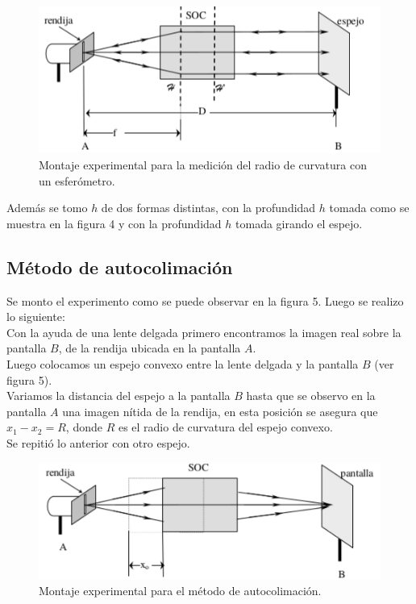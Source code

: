 \documentclass[13,twocolumn,letterpaper]{article}
\begin{document}
{{	\begin{figure}[h!]
		\centering
		\includegraphics[width=0.7\linewidth]{fig4}
		\caption[fig 4]{Montaje experimental para la medición del radio de curvatura con un esferómetro.}
		\label{fig:fig4}
	\end{figure}
Además se tomo $h$ de dos formas distintas, con la profundidad $h$ tomada como se muestra en la figura 4 y con la profundidad $h$ tomada girando el espejo. 

}
\subsection*{Método de autocolimación}
{
	Se monto el experimento como se puede observar en la figura 5. Luego se realizo lo siguiente:\\ 
	Con la ayuda de una lente delgada primero encontramos la imagen real sobre la pantalla $B$, de la rendija ubicada en la pantalla $A$.\\
	Luego colocamos un espejo convexo entre la lente delgada y la pantalla $B$ (ver figura 5).\\
	Variamos la distancia del espejo a la pantalla $B$ hasta que se observo en la pantalla $A$ una imagen nítida de la rendija, en esta posición se asegura que $x_{1}-x_{2}=R$, donde $R$ es el radio de curvatura del espejo convexo.
	\\Se repitió lo anterior con otro espejo.
		\begin{figure}[h!]
		\centering
		\includegraphics[width=0.7\linewidth]{fig5}
		\caption[fig 4]{Montaje experimental para el método de autocolimación.}
		\label{fig:fig5}
	\end{figure}
}

}
\end{document}
